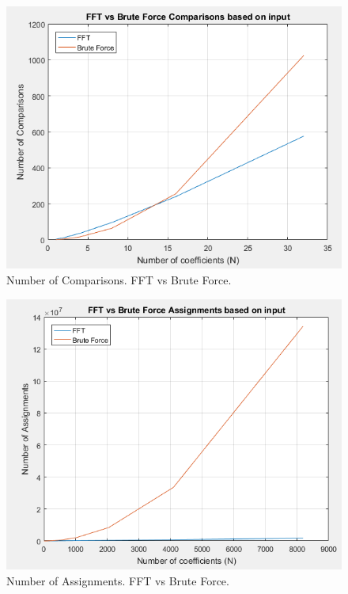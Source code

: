\documentclass[12pt]{article}
\begin{document}
        \begin{figure}[H]
            \centerline{\includegraphics[scale=0.5]{images/BruteVSFFT_ZoomIn_Comparisons}}
            \caption{Number of Comparisons. FFT vs Brute Force.}
            \label{fig:compZoom}
        \end{figure}
        \begin{figure}[H]
            \centerline{\includegraphics[scale=0.5]{images/BruteVSFFT_8192}}
            \caption{Number of Assignments. FFT vs Brute Force.}
            \label{fig:assign8192}
        \end{figure} 
\end{document}
